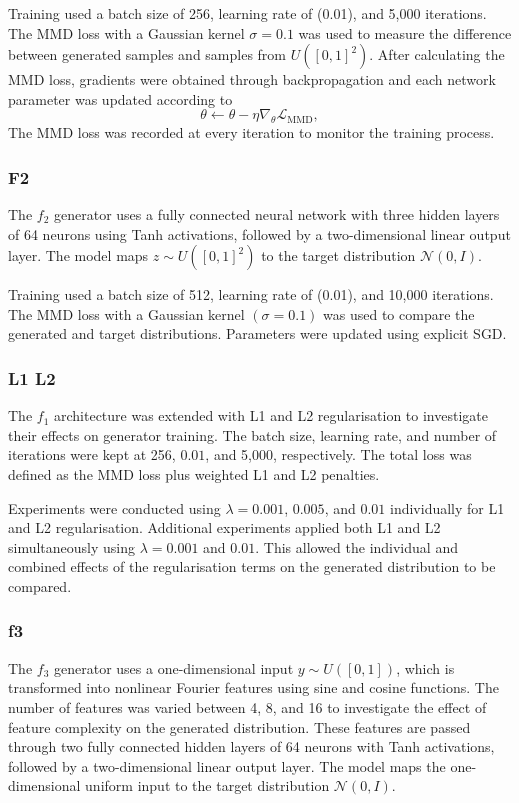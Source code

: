 \documentclass[conference,a4paper]{IEEEtran}
\begin{document}
Training used a batch size of 256, learning rate of (0.01), and 5,000 iterations. The MMD loss with a Gaussian kernel $\sigma=0.1$ was used to measure the difference between generated samples and samples from $U([0,1]^2)$. After calculating the MMD loss, gradients were obtained through backpropagation and each network parameter was updated according to
\[
\theta \leftarrow \theta-\eta\nabla_{\theta}\mathcal{L}_{\mathrm{MMD}},
\]
The MMD loss was recorded at every iteration to monitor the training process.
\subsubsection{F2}

The $f_2$ generator uses a fully connected neural network with three hidden layers of 64 neurons using Tanh activations, followed by a two-dimensional linear output layer. The model maps $z\sim U([0,1]^2)$ to the target distribution $\mathcal{N}(0,I)$.

Training used a batch size of 512, learning rate of (0.01), and 10,000 iterations. The MMD loss with a Gaussian kernel $(\sigma=0.1)$ was used to compare the generated and target distributions. Parameters were updated using explicit SGD.
\subsubsection{L1 L2}

The $f_1$ architecture was extended with L1 and L2 regularisation to investigate their effects on generator training. The batch size, learning rate, and number of iterations were kept at 256, $0.01$, and 5,000, respectively. The total loss was defined as the MMD loss plus weighted L1 and L2 penalties.

Experiments were conducted using $\lambda=0.001$, $0.005$, and $0.01$ individually for L1 and L2 regularisation. Additional experiments applied both L1 and L2 simultaneously using $\lambda=0.001$ and $0.01$. This allowed the individual and combined effects of the regularisation terms on the generated distribution to be compared.

\subsubsection{f3}

The \(f_3\) generator uses a one-dimensional input \(y\sim U([0,1])\), which is transformed into nonlinear Fourier features using sine and cosine functions. The number of features was varied between 4, 8, and 16 to investigate the effect of feature complexity on the generated distribution. These features are passed through two fully connected hidden layers of 64 neurons with Tanh activations, followed by a two-dimensional linear output layer. The model maps the one-dimensional uniform input to the target distribution \(\mathcal{N}(0,I)\).
\end{document}

